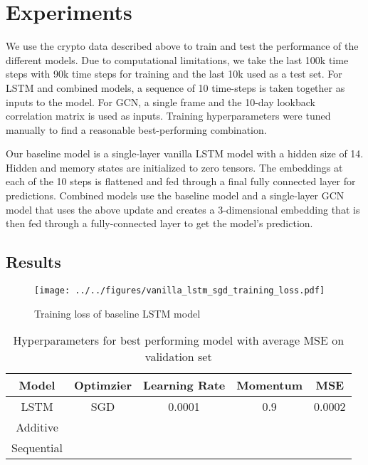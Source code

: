 \section{Experiments}

We use the crypto data described above to train and test the performance of the different models. Due to computational limitations, we take the last 100k time steps with 90k time steps for training and the last 10k used as a test set. For LSTM and combined models, a sequence of 10 time-steps is taken together as inputs to the model. For GCN, a single frame and the 10-day lookback correlation matrix is used as inputs. Training hyperparameters were tuned manually to find a reasonable best-performing combination.

Our baseline model is a single-layer vanilla LSTM model with a hidden size of 14. Hidden and memory states are initialized to zero tensors. The embeddings at each of the 10 steps is flattened and fed through a final fully connected layer for predictions. Combined models use the baseline model and a single-layer GCN model that uses the above update and creates a 3-dimensional embedding that is then fed through a fully-connected layer to get the model's prediction.

\subsection{Results}

\begin{figure}[H]
	\centering
	\texttt{[image: ../../figures/vanilla\_lstm\_sgd\_training\_loss.pdf]}
	\caption{Training loss of baseline LSTM model}
	\label{fig:lstm_loss}
\end{figure}

\begin{table}[H]
	\centering
	\begin{tabular}{|c|c|c|c|c|}
	\hline
	Model & Optimzier & Learning Rate & Momentum & MSE \\
	\hline
	LSTM & SGD & 0.0001 & 0.9 & 0.0002 \\
	Additive & & & & \\
	Sequential & & & & \\
	\hline
	\end{tabular}
	\caption{Hyperparameters for best performing model with average MSE on validation set}
	\label{tab:results_summary}
\end{table}